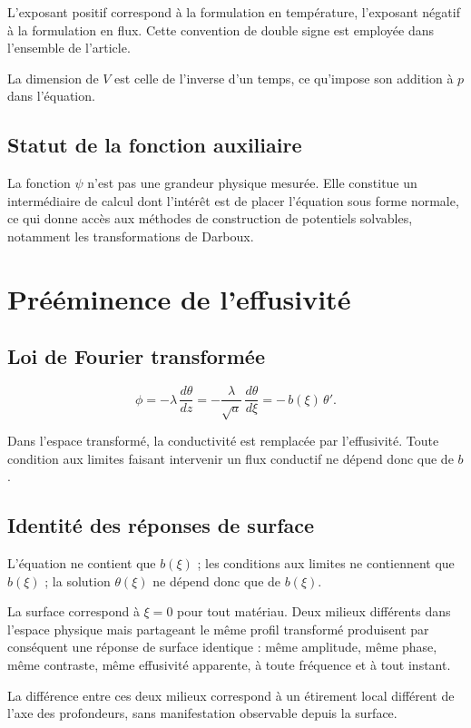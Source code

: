 \documentclass[11pt,a4paper]{article}
\begin{document}
L'exposant positif correspond à la formulation en température, l'exposant négatif à la formulation en
flux. Cette convention de double signe est employée dans l'ensemble de l'article.

La dimension de $V$ est celle de l'inverse d'un temps, ce qu'impose son addition à $p$ dans l'équation.

\subsection{Statut de la fonction auxiliaire}

La fonction $\psi$ n'est pas une grandeur physique mesurée. Elle constitue un intermédiaire de calcul
dont l'intérêt est de placer l'équation sous forme normale, ce qui donne accès aux méthodes de
construction de potentiels solvables, notamment les transformations de Darboux.

\section{Prééminence de l'effusivité}

\subsection{Loi de Fourier transformée}

\[ \phi = -\lambda\,\frac{d\theta}{dz}
= -\frac{\lambda}{\sqrt{a}}\,\frac{d\theta}{d\xi}
= -\,b(\xi)\,\theta' . \]

Dans l'espace transformé, la conductivité est remplacée par l'effusivité. Toute condition aux limites
faisant intervenir un flux conductif ne dépend donc que de $b$.

\subsection{Identité des réponses de surface}

L'équation ne contient que $b(\xi)$ ; les conditions aux limites ne contiennent que $b(\xi)$ ; la
solution $\theta(\xi)$ ne dépend donc que de $b(\xi)$.

La surface correspond à $\xi = 0$ pour tout matériau. Deux milieux différents dans l'espace physique
mais partageant le même profil transformé produisent par conséquent une réponse de surface identique :
même amplitude, même phase, même contraste, même effusivité apparente, à toute fréquence et à tout
instant.

La différence entre ces deux milieux correspond à un étirement local différent de l'axe des
profondeurs, sans manifestation observable depuis la surface.
\end{document}
